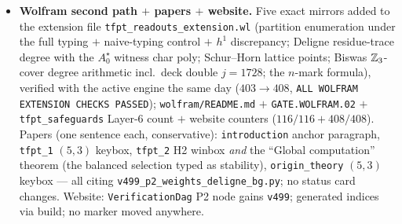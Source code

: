 \documentclass[11pt]{article}
\begin{document}
\begin{itemize}[leftmargin=1.5em]
$y^3=(z{-}1)(z{-}i)(z{+}1)^2(z{+}i)^2$ (genus $2$; NOT the pillowcase double, genus $1$, $j=1728$ ---
the deck side); $p_*\mathcal O_Y=\mathcal O\oplus\mathcal O(-2)^2$; the regular-representation model
lands on $\{0,2,2\}$ $=$ the \emph{unstable} Schur--Horn companion ($h^0=1$): integrality and the sum
rule come \emph{out} of the correspondence, stability is the selector. \emph{Negative controls}: no
positivity $\to4$/$31$ solutions; $\deg-3/-5$ breaks; $n$-mark scan $e_2=(n{-}2)(n{+}1)/2=5$ ONLY at
$n=4$ (the value, not the uniqueness, is the $n{=}4$ content); MS-rational $e_2=\tfrac{16}3$,
$\tfrac{44}9$. \emph{Honest residuals} (P2 stays an axiom): R1 module identification \mC\
(\texttt{QGEO.SYM} territory), R2 (U) \mC\ (\texttt{v33}/\texttt{v40}), R3 analytic monodromy
(Numerical, \texttt{v117} check 4); non-circular (neither \texttt{v23}'s splitting input nor
\texttt{v115}'s $\operatorname{diag}A_0=a/4$ input used); the \texttt{v491} direction-reversal note
carries over. Ledger: new row \texttt{P2.TYPING.01}; the \texttt{v491}/\texttt{P2.PARTITION.01} row
records ``typing residual sharpened by \texttt{v499}'' (\texttt{v491} stays active, no supersede).
Registry $+$ \texttt{run\_all} (493 modules, suite green).
\item \textbf{Wolfram second path $+$ papers $+$ website.} Five exact mirrors added to the extension
file \texttt{tfpt\_readouts\_extension.wl} (partition enumeration under the full typing $+$ naive-typing
control $+$ $h^1$ discrepancy; Deligne residue-trace degree with the $A_0^\star$ witness char poly;
Schur--Horn lattice points; Biswas $\mathbb{Z}_3$-cover degree arithmetic incl.\ deck double $j=1728$; the
$n$-mark formula), verified with the active engine the same day ($403\to408$, \texttt{ALL WOLFRAM
EXTENSION CHECKS PASSED}); \texttt{wolfram/README.md} $+$ \texttt{GATE.WOLFRAM.02} $+$
\texttt{tfpt\_safeguards} Layer-6 count $+$ website counters ($116/116+408/408$). Papers (one sentence
each, conservative): \texttt{introduction} anchor paragraph, \texttt{tfpt\_1} $(5,3)$ keybox,
\texttt{tfpt\_2} H2 winbox \emph{and} the ``Global computation'' theorem (the balanced selection typed
as stability), \texttt{origin\_theory} $(5,3)$ keybox --- all citing
\texttt{v499\_p2\_weights\_deligne\_bg.py}; no status card changes. Website: \texttt{VerificationDag}
P2 node gains \texttt{v499}; generated indices via build; no marker moved anywhere.
\end{itemize}
\end{document}
